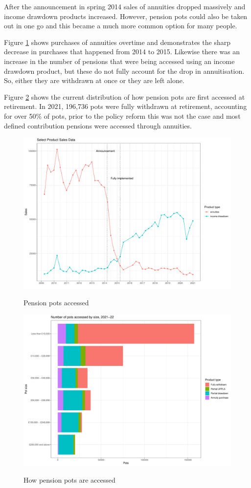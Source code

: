 \documentclass[12pt]{article}
\begin{document}
After the announcement in spring 2014 sales of annuities dropped massively and income drawdown products increased.
However, pension pots could also be taken out in one go and this became a much more common option for many people.

Figure \ref{fig:annovertime} shows purchases of annuities overtime and demonstrates the sharp decrease
in purchases that happened from 2014 to 2015. Likewise there was an increase in the number of pensions that were
being accessed using an income drawdown product, but these do not fully account for the drop in annuitisation. So,
either they are withdrawn at once or they are left alone.

Figure \ref{fig:ann2122} shows the current distribution of how pension pots are first accessed at retirement.
In 2021, 196,736 pots were fully withdrawn at retirement, accounting for over 50\% of pots, prior to the policy
reform this was not the case and most defined contribution pensions were accessed through annuities.


\begin{figure}[h]
  \caption{Pension pots accessed}
  \centering
  \includegraphics[width=0.7\columnwidth]{figures/annuity_overtime.pdf}
  \label{fig:annovertime}
\end{figure}

\begin{figure}[h]
  \caption{How pension pots are accessed}
  \centering
  \includegraphics[width=0.7\columnwidth]{figures/annuity_pot_sizes.pdf}
  \label{fig:ann2122}
\end{figure}
\end{document}

